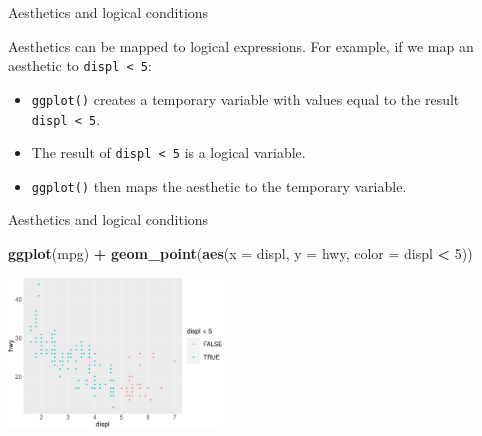 \documentclass[ignorenonframetext,]{beamer}
\newenvironment{Shaded}{\begin{snugshade}}{\end{snugshade}}
\newcommand{\DataTypeTok}[1]{\textcolor[rgb]{0.13,0.29,0.53}{#1}}
\newcommand{\DecValTok}[1]{\textcolor[rgb]{0.00,0.00,0.81}{#1}}
\newcommand{\KeywordTok}[1]{\textcolor[rgb]{0.13,0.29,0.53}{\textbf{#1}}}
\newcommand{\NormalTok}[1]{#1}
\newcommand{\OperatorTok}[1]{\textcolor[rgb]{0.81,0.36,0.00}{\textbf{#1}}}
\newcommand{\StringTok}[1]{\textcolor[rgb]{0.31,0.60,0.02}{#1}}
\begin{document}
\begin{frame}[fragile]{Aesthetics and logical conditions}
\protect\hypertarget{aesthetics-and-logical-conditions}{}

Aesthetics can be mapped to logical expressions. For example, if we map
an aesthetic to \texttt{displ\ \textless{}\ 5}:

\begin{itemize}
\item
  \texttt{ggplot()} creates a temporary variable with values equal to
  the result \texttt{displ\ \textless{}\ 5}.
\item
  The result of \texttt{displ\ \textless{}\ 5} is a logical variable.
\item
  \texttt{ggplot()} then maps the aesthetic to the temporary variable.
\end{itemize}

\end{frame}

\begin{frame}[fragile]{Aesthetics and logical conditions}
\protect\hypertarget{aesthetics-and-logical-conditions-1}{}

\begin{Shaded}
\begin{Highlighting}[]
\KeywordTok{ggplot}\NormalTok{(mpg) }\OperatorTok{+}\StringTok{ }
\StringTok{  }\KeywordTok{geom_point}\NormalTok{(}\KeywordTok{aes}\NormalTok{(}\DataTypeTok{x =}\NormalTok{ displ, }\DataTypeTok{y =}\NormalTok{ hwy, }
                 \DataTypeTok{color =}\NormalTok{ displ }\OperatorTok{<}\StringTok{ }\DecValTok{5}\NormalTok{))}
\end{Highlighting}
\end{Shaded}

\begin{center}\includegraphics[height=150px]{data-visualization_files/figure-beamer/unnamed-chunk-36-1} \end{center}

\end{frame}
\end{document}
